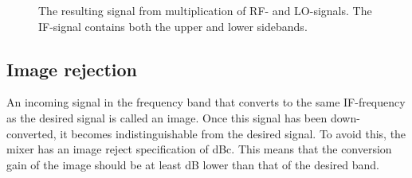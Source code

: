 			\begin{figure}[hpt!]
				\centering
				\caption{The resulting signal from multiplication of RF- and LO-signals. The IF-signal contains both the upper and lower sidebands.}\label{fig:mixing_function}
			\end{figure}

		\subsection{Image rejection}
			An incoming signal in the frequency band that converts to the same IF-frequency as the desired signal is called an image. Once this signal has been down-converted, it becomes indistinguishable from the desired signal. To avoid this, the mixer has an image reject specification of \unit[30]{dBc}. This means that the conversion gain of the image should be at least \unit[30]{dB} lower than that of the desired band.


